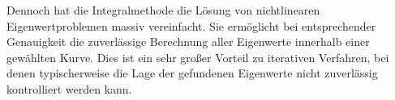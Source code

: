 Dennoch hat die Integralmethode die Lösung von nichtlinearen Eigenwertproblemen massiv vereinfacht.
Sie ermöglicht bei entsprechender Genauigkeit die zuverlässige Berechnung aller Eigenwerte innerhalb einer gewählten Kurve.
Dies ist ein sehr großer Vorteil zu iterativen Verfahren, bei denen typischerweise die Lage der gefundenen Eigenwerte nicht zuverlässig kontrolliert werden kann.
